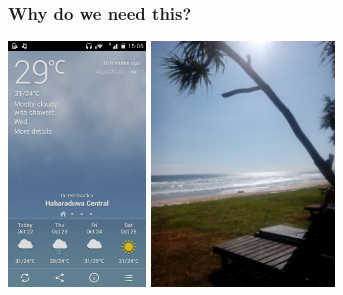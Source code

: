 \documentclass[serif,mathserif]{beamer}
\begin{document}
\begin{frame}
  \frametitle{Why do we need this?}
  \begin{center}
  \includegraphics[height=6.5cm]{Screenshot_2014-10-22-15-05-21}
  \hspace{1mm}
  \includegraphics[height=6.5cm]{IMG_20141022_150543}
  \end{center}
\end{frame}

\end{document}
